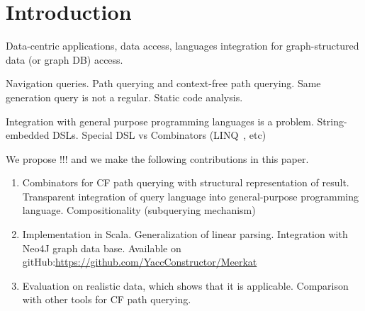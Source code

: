 \section{Introduction}

Data-centric applications, data access, languages integration for graph-structured data (or graph DB) access.

Navigation queries.
Path querying and context-free path querying.
Same generation query is not a regular.
Static code analysis.

Integration with general purpose programming languages is a problem.
String-embedded DSLs.
Special DSL vs Combinators (LINQ~\cite{LINQ1, LINQ2}, etc)~\cite{ScalaGraphParsing}

We propose !!! and we make the following contributions in this paper.
\begin{enumerate}
\item Combinators for CF path querying with structural representation of result.
 Transparent integration of query language into general-purpose programming language. Compositionality (subquerying mechanism)
\item Implementation in Scala. Generalization of linear parsing. Integration with Neo4J graph data base. Available on gitHub:\url{https://github.com/YaccConstructor/Meerkat}
\item Evaluation on realistic data, which shows that it is applicable. Comparison  with other tools 
for CF path querying.
\end{enumerate}